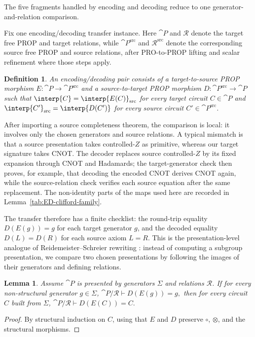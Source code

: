\documentclass[10pt,a4paper]{article}
\newtheorem{lemma}[theorem]{Lemma}
\newtheorem{definition}[theorem]{Definition}
\def\cref#1{Lemma~\ref{#1}}%
\begin{document}
The five fragments handled by encoding and decoding reduce to one generator-and-relation
comparison.

Fix one encoding/decoding transfer instance.  Here \(\cat{P}\) and \(\mathcal{R}\) denote the
target free PROP and target relations, while \(\cat{P}^{\mathrm{src}}\) and
\(\mathcal{R}^{\mathrm{src}}\) denote the corresponding source free PROP and source relations,
after PRO-to-PROP lifting and scalar refinement where those steps apply.

\begin{definition}\label{def:encdec}
An encoding/decoding pair consists of a target-to-source PROP morphism
\(E:\cat{P}\to\cat{P}^{\mathrm{src}}\) and a source-to-target PROP morphism
\(D:\cat{P}^{\mathrm{src}}\to\cat{P}\) such that
\(\interp{C}=\interp{E(C)}_{\mathrm{src}}\) for every target circuit \(C\in\cat{P}\) and
\(\interp{C'}_{\mathrm{src}}=\interp{D(C')}\) for every source circuit
\(C'\in\cat{P}^{\mathrm{src}}\).
\end{definition}

After importing a source completeness theorem, the comparison is local: it involves only the chosen
generators and source relations.  A typical mismatch is that a source presentation takes
controlled-\(Z\) as primitive, whereas our target signature takes CNOT.  The decoder replaces source
controlled-\(Z\) by its fixed expansion through CNOT and Hadamards; the target-generator check then
proves, for example, that decoding the encoded CNOT derives CNOT again, while the source-relation
check verifies each source equation after the same replacement.  The non-identity parts of the maps
used here are recorded in \cref{tab:ED-clifford-family}.

The transfer therefore has a finite checklist: the round-trip equality \(D(E(g))=g\) for each
target generator \(g\), and the decoded equality \(D(L)=D(R)\) for each source axiom \(L=R\).
This is the presentation-level analogue of Reidemeister--Schreier rewriting
\cite{Reidemeister1927,Schreier1927}: instead of computing a subgroup presentation, we compare two
chosen presentations by following the images of their generators and defining relations.

\begin{lemma}\label{lem:decenc}
Assume \(\cat{P}\) is presented by generators \(\Sigma\) and relations \(\mathcal{R}\).
If for every non-structural generator \(g\in\Sigma\),
\(
  \cat{P}/\mathcal{R}\vdash D(E(g)) = g,
\)
then for every circuit \(C\) built from \(\Sigma\),
\(
  \cat{P}/\mathcal{R}\vdash D(E(C)) = C.
\)
\end{lemma}
\begin{proof}
By structural induction on \(C\), using that \(E\) and \(D\) preserve \(\circ\), \(\otimes\), and the
structural morphisms.
\end{proof}
\end{document}
